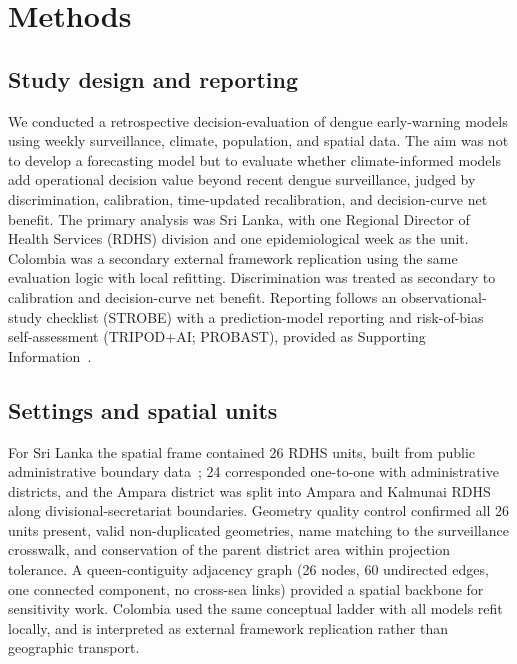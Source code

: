 \documentclass[11pt,a4paper]{article}
\begin{document}
\section{Methods}

\subsection{Study design and reporting}
We conducted a retrospective decision-evaluation of dengue early-warning models using weekly surveillance, climate, population, and spatial data. The aim was not to develop a forecasting model but to evaluate whether climate-informed models add operational decision value beyond recent dengue surveillance, judged by discrimination, calibration, time-updated recalibration, and decision-curve net benefit. The primary analysis was Sri Lanka, with one Regional Director of Health Services (RDHS) division and one epidemiological week as the unit. Colombia was a secondary external framework replication using the same evaluation logic with local refitting. Discrimination was treated as secondary to calibration and decision-curve net benefit. Reporting follows an observational-study checklist (STROBE) with a prediction-model reporting and risk-of-bias self-assessment (TRIPOD+AI; PROBAST), provided as Supporting Information~\cite{vonElm2007,Collins2024TRIPODAI,Wolff2019,Moons2019}.

\subsection{Settings and spatial units}
For Sri Lanka the spatial frame contained 26 RDHS units, built from public administrative boundary data~\cite{HDXCODABSriLanka}; 24 corresponded one-to-one with administrative districts, and the Ampara district was split into Ampara and Kalmunai RDHS along divisional-secretariat boundaries. Geometry quality control confirmed all 26 units present, valid non-duplicated geometries, name matching to the surveillance crosswalk, and conservation of the parent district area within projection tolerance. A queen-contiguity adjacency graph (26 nodes, 60 undirected edges, one connected component, no cross-sea links) provided a spatial backbone for sensitivity work. Colombia used the same conceptual ladder with all models refit locally, and is interpreted as external framework replication rather than geographic transport.
\end{document}
